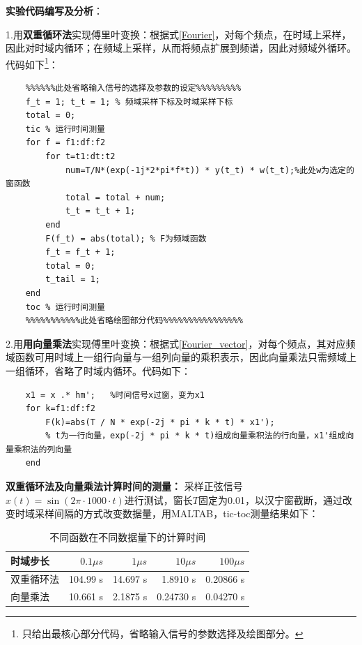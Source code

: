\documentclass[12pt]{article}
\begin{document}
\textbf{实验代码编写及分析}：

1.用\textbf{双重循环法}实现傅里叶变换：根据式\ref{Fourier}，对每个频点，在时域上采样，因此对时域内循环；在频域上采样，从而将频点扩展到频谱，因此对频域外循环。代码如下\footnote{只给出最核心部分代码，省略输入信号的参数选择及绘图部分。}：
\begin{lstlisting}
    %%%%%%此处省略输入信号的选择及参数的设定%%%%%%%%%
    f_t = 1; t_t = 1; % 频域采样下标及时域采样下标
    total = 0; 
    tic % 运行时间测量
    for f = f1:df:f2
        for t=t1:dt:t2
            num=T/N*(exp(-1j*2*pi*f*t)) * y(t_t) * w(t_t);%此处w为选定的窗函数
            total = total + num;
            t_t = t_t + 1;
        end
        F(f_t) = abs(total); % F为频域函数
        f_t = f_t + 1;
        total = 0;
        t_tail = 1;
    end
    toc % 运行时间测量
    %%%%%%%%%%%此处省略绘图部分代码%%%%%%%%%%%%%%%%
\end{lstlisting}

2.用\textbf{用向量乘法}实现傅里叶变换：根据式\ref{Fourier_vector}，对每个频点，其对应频域函数可用时域上一组行向量与一组列向量的乘积表示，因此向量乘法只需频域上一组循环，省略了时域内循环。代码如下：
\begin{lstlisting}
    x1 = x .* hm';   %时间信号x过窗，变为x1
    for k=f1:df:f2
        F(k)=abs(T / N * exp(-2j * pi * k * t) * x1'); 
        % t为一行向量，exp(-2j * pi * k * t)组成向量乘积法的行向量，x1'组成向量乘积法的列向量
    end
\end{lstlisting}

\textbf{双重循环法及向量乘法计算时间的测量：}
采样正弦信号$x(t)=\sin (2\pi\cdot 1000 \cdot t)$进行测试，窗长$T$固定为0.01，以汉宁窗截断，通过改变时域采样间隔的方式改变数据量，用MALTAB，tic-toc测量结果如下：
\begin{table}[H]
		\setlength{\abovecaptionskip}{0cm} 
		\setlength{\belowcaptionskip}{0.2cm}
    \centering
     \caption{不同函数在不同数据量下的计算时间}
    \begin{tabular}{lrrrr}
    \toprule[1.5pt]
    \midrule
       时域步长  & $0.1\mu s$ & $1\mu s$ & $10\mu s$ & $100\mu s$\\
         \midrule
       双重循环法 & 104.99 s & 14.697 s & 1.8910 s & 0.20866 s\\
        向量乘法  & 10.661 s & 2.1875 s & 0.24730 s & 0.04270 s\\
         \bottomrule[1.5pt]
    \end{tabular}
    \label{runtime}
\end{table}
\end{document}
